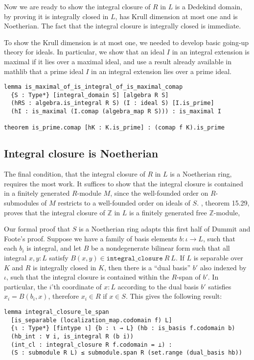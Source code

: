 \documentclass[a4paper,USenglish,cleveref, autoref, thm-restate]{lipics-v2021}
\newcommand{\lean}[1]{\texttt{#1}\xspace} %
\newcommand{\mathlib}{\textsf{mathlib}\xspace}
\newcommand{\Z}{\mathbb{Z}}
\begin{document}
Now we are ready to show the integral closure of $R$ in $L$ is a Dedekind domain,
by proving it is integrally closed in $L$, has Krull dimension at most one and is Noetherian.
The fact that the integral closure is integrally closed is immediate.

To show the Krull dimension is at most one, we needed to develop basic going-up theory for ideals.
In particular, we show that an ideal $I$ in an integral extension is maximal if it lies over a maximal ideal,
and use a result already available in \mathlib that a prime ideal $I$ in an integral extension lies over a prime ideal.
\begin{lstlisting}
lemma is_maximal_of_is_integral_of_is_maximal_comap
  {S : Type*} [integral_domain S] [algebra R S]
  (hRS : algebra.is_integral R S) (I : ideal S) [I.is_prime]
  (hI : is_maximal (I.comap (algebra_map R S))) : is_maximal I

theorem is_prime.comap [hK : K.is_prime] : (comap f K).is_prime
\end{lstlisting}

\subsection{Integral closure is Noetherian}
The final condition, that the integral closure of $R$ in $L$ is a Noetherian ring, requires the most work.
It suffices to show that the integral closure is contained in a finitely generated $R$-module $M$,
since the well-founded order on $R$-submodules of $M$ restricts to a well-founded order on ideals of $S$.
\cite{Dummit-and-Foote}, theorem 15.29, proves that the integral closure of $\Z$ in $L$ is a finitely generated free $\Z$-module,

Our formal proof that $S$ is a Noetherian ring adapts this first half of Dummit and Foote's proof.
Suppose we have a family of basis elements $b : \iota \to L$, such that each $b_i$ is integral,
and let $B$ be a nondegenerate bilinear form such that all integral $x, y : L$ satisfy $B(x, y) \in \lean{integral\_closure}\ R\ L$.
If $L$ is separable over $K$ and $R$ is integrally closed in $K$,
then there is a ``dual basis'' $b'$ also indexed by $\iota$, such that the integral closure is contained within the $R$-span of $b'$.
In particular, the $i$'th coordinate of $x : L$ according to the dual basis $b'$ satisfies $x_i = B(b_i, x)$,
therefore $x_i \in R$ if $x \in S$.
This gives the following result: %
\begin{lstlisting}
lemma integral_closure_le_span
  [is_separable (localization_map.codomain f) L]
  {ι : Type*} [fintype ι] {b : ι → L} (hb : is_basis f.codomain b)
  (hb_int : ∀ i, is_integral R (b i))
  (int_cl : integral_closure R f.codomain = ⊥) :
  (S : submodule R L) ≤ submodule.span R (set.range (dual_basis hb))
\end{lstlisting}
\end{document}
